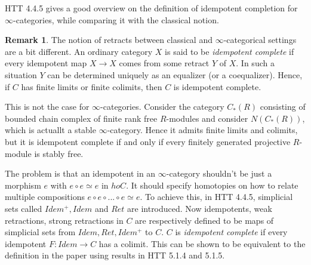 \documentclass[letterpaper]{article}
\theoremstyle{definition}
\newtheorem{remark}[lemma]{Remark}
\begin{document}
HTT 4.4.5 gives a good overview on the definition of idempotent completion for $\infty$-categories, while comparing it with the classical notion. 

\begin{remark} The notion of retracts between classical and $\infty$-categorical settings are a bit different. An ordinary category $X$ is said to be \textit{idempotent complete} if every idempotent map $X \rightarrow X$ comes from some retract $Y$ of $X$. In such a situation $Y$ can be determined uniquely as an equalizer (or a coequalizer). Hence, if $C$ has finite limits or finite colimits, then $C$ is idempotent complete. 

This is not the case for $\infty$-categories. Consider the category $C_*(R)$ consisting of bounded chain complex of finite rank free $R$-modules and consider $N(C_*(R))$, which is actuallt a stable $\infty$-category. Hence it admits finite limits and colimits, but it is idempotent complete if and only if every finitely generated projective $R$-module is stably free. 

The problem is that an idempotent in an $\infty$-category shouldn't be just a morphism $e$ with $e \circ e \simeq e$ in $ho C$. It should specify homotopies on how to relate multiple compositions $e \circ e \circ ... \circ e \simeq e$. To achieve this, in HTT 4.4.5, simplicial sets called $Idem^+, Idem$ and $Ret$ are introduced. Now idempotents, weak retractions, strong retractions in $C$ are respectively defined to be maps of simplicial sets from $Idem, Ret, Idem^+$ to $C$. $C$ is \textit{idempotent complete} if every idempotent $F : Idem \rightarrow C$ has a colimit. This can be shown to be equivalent to the definition in the paper using results in HTT 5.1.4 and 5.1.5.
\end{remark}
\end{document}
